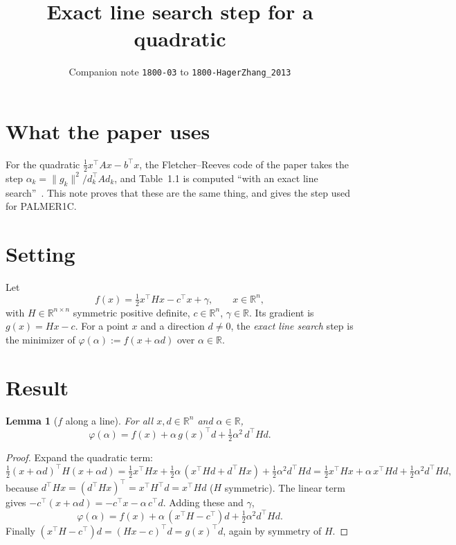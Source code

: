 \documentclass[11pt]{article}
\title{Exact line search step for a quadratic}
\author{Companion note \texttt{1800-03} to \texttt{1800-HagerZhang\_2013}}
\date{}
\newtheorem{lemma}{Lemma}
\newcommand{\R}{\mathbb{R}}
\begin{document}
\maketitle

\section{What the paper uses}

For the quadratic $\tfrac12x^{\top}Ax-b^{\top}x$, the Fletcher--Reeves code of
the paper takes the step $\alpha_k=\|g_k\|^2/d_k^{\top}Ad_k$, and Table~1.1 is
computed ``with an exact line search''~\cite[pp.~2150--2152]{HZ13}. This note
proves that these are the same thing, and gives the step used for PALMER1C.

\section{Setting}

Let
\[
f(x)=\tfrac12x^{\top}Hx-c^{\top}x+\gamma,\qquad x\in\R^n,
\]
with $H\in\R^{n\times n}$ symmetric positive definite, $c\in\R^n$, $\gamma\in\R$.
Its gradient is $g(x)=Hx-c$. For a point $x$ and a direction $d\ne0$, the
\emph{exact line search} step is the minimizer of $\varphi(\alpha):=f(x+\alpha d)$
over $\alpha\in\R$.

\section{Result}

\begin{lemma}[$f$ along a line]\label{lem}
For all $x,d\in\R^n$ and $\alpha\in\R$,
\[
\varphi(\alpha)=f(x)+\alpha\,g(x)^{\top}d+\tfrac12\alpha^2\,d^{\top}Hd .
\]
\end{lemma}

\begin{proof}
Expand the quadratic term:
\[
\tfrac12(x+\alpha d)^{\top}H(x+\alpha d)
=\tfrac12x^{\top}Hx+\tfrac12\alpha\,(x^{\top}Hd+d^{\top}Hx)+\tfrac12\alpha^2d^{\top}Hd
=\tfrac12x^{\top}Hx+\alpha\,x^{\top}Hd+\tfrac12\alpha^2d^{\top}Hd,
\]
because $d^{\top}Hx=(d^{\top}Hx)^{\top}=x^{\top}H^{\top}d=x^{\top}Hd$ ($H$
symmetric). The linear term gives $-c^{\top}(x+\alpha d)=-c^{\top}x-\alpha\,c^{\top}d$.
Adding these and $\gamma$,
\[
\varphi(\alpha)=f(x)+\alpha\,(x^{\top}H-c^{\top})d+\tfrac12\alpha^2d^{\top}Hd .
\]
Finally $(x^{\top}H-c^{\top})d=(Hx-c)^{\top}d=g(x)^{\top}d$, again by symmetry of $H$.
\end{proof}
\end{document}
